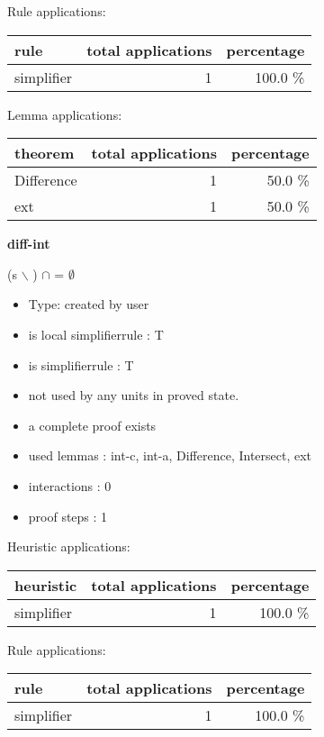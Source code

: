 \documentclass[a4paper]{article}
\begin{document}
Rule applications:

\begin{supertabular}{l|r|r}
rule	        & total applications & percentage \\ \hline
simplifier & 1 & 100.0 \% \\

\end{supertabular}

Lemma applications:

\begin{supertabular}{l|r|r}
theorem	        & total applications & percentage \\ \hline
Difference & 1 & 50.0 \% \\
ext & 1 & 50.0 \% \\

\end{supertabular}
\pagebreak

{\LARGE\bf diff-int}\label{lemma-diff-int}

\medskip

 \Fol (s $\backslash$ ) $\cap$  = $\emptyset$

\begin{itemize}

\item Type: created by user

\item is local simplifierrule : T
\item is simplifierrule : T
\item not used by any units in proved state.
\item       a complete proof exists
\item       used lemmas  : int-c, int-a, Difference, Intersect, ext
\item       interactions : 0
\item       proof steps  : 1
\end{itemize}

\medskip


Heuristic applications:

\begin{supertabular}{l|r|r}
heuristic	& total applications & percentage \\ \hline
simplifier & 1 & 100.0 \% \\

\end{supertabular}

Rule applications:

\begin{supertabular}{l|r|r}
rule	        & total applications & percentage \\ \hline
simplifier & 1 & 100.0 \% \\

\end{supertabular}
\end{document}
